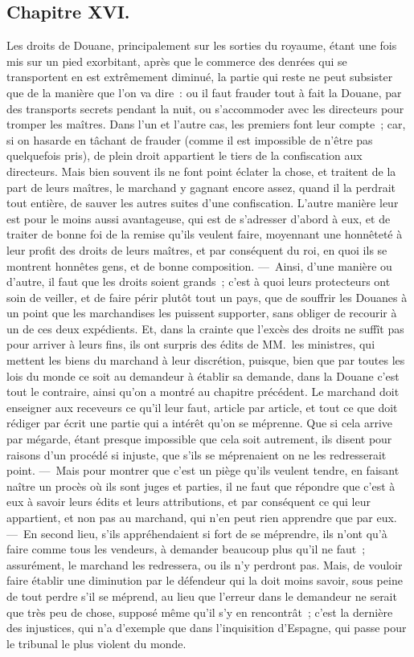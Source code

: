 \documentclass[french,twoside]{book} %
\begin{document}
\subsection[{Chapitre XVI.}]{Chapitre XVI.}
\noindent Les droits de Douane, principalement sur les sorties du royaume, étant une fois mis sur un pied exorbitant, après que le commerce des denrées qui se transportent en est extrêmement diminué, la partie qui reste ne peut subsister que de la manière que l’on va dire : ou il faut frauder tout à fait la Douane, par des transports secrets pendant la nuit, ou s’accommoder avec les directeurs pour tromper les maîtres. Dans l’un et l’autre cas, les premiers font leur compte ; car, si on hasarde en tâchant de frauder (comme il est impossible de n’être pas quelquefois pris), de plein droit appartient le tiers de la confiscation aux directeurs. Mais bien souvent ils ne font point éclater la chose, et traitent de la part de leurs maîtres, le marchand y gagnant encore assez, quand il la perdrait tout entière, de sauver les autres suites d’une confiscation. L’autre manière leur est pour le moins aussi avantageuse, qui est de s’adresser d’abord à eux, et de traiter de bonne foi de la remise qu’ils veulent faire, moyennant une honnêteté à leur profit des droits de leurs maîtres, et par conséquent du roi, en quoi ils se montrent honnêtes gens, et de bonne composition. — Ainsi, d’une manière ou d’autre, il faut que les droits soient grands ; c’est à quoi leurs protecteurs ont soin de veiller, et de faire périr plutôt tout un pays, que de souffrir les Douanes à un point que les marchandises les puissent supporter, sans obliger de recourir à un de ces deux expédients. Et, dans la crainte que l’excès des droits ne suffît pas pour arriver à leurs fins, ils ont surpris des édits de MM. les ministres, qui mettent les biens du marchand à leur discrétion, puisque, bien que par toutes les lois du monde ce soit au demandeur à établir sa demande, dans la Douane c’est tout le contraire, ainsi qu’on a montré au chapitre précédent. Le marchand doit enseigner aux receveurs ce qu’il leur faut, article par article, et tout ce que doit rédiger par écrit une partie qui a intérêt qu’on se méprenne. Que si cela arrive par mégarde, étant presque impossible que cela soit autrement, ils disent pour raisons d’un procédé si injuste, que s’ils se méprenaient on ne les redresserait point. — Mais pour montrer que c’est un piège qu’ils veulent tendre, en faisant naître un procès où ils sont juges et parties, il ne faut que répondre que c’est à eux à savoir leurs édits et leurs attributions, et par conséquent ce qui leur appartient, et non pas au marchand, qui n’en peut rien apprendre que par eux. — En second lieu, s’ils appréhendaient si fort de se méprendre, ils n’ont qu’à faire comme tous les vendeurs, à demander beaucoup plus qu’il ne faut ; assurément, le marchand les redressera, ou ils n’y perdront pas. Mais, de vouloir faire établir une diminution par le défendeur qui la doit moins savoir, sous peine de tout perdre s’il se méprend, au lieu que l’erreur dans le demandeur ne serait que très peu de chose, supposé même qu’il s’y en rencontrât ; c’est la dernière des injustices, qui n’a d’exemple que dans l’inquisition d’Espagne, qui passe pour le tribunal le plus violent du monde.\par
\end{document}
